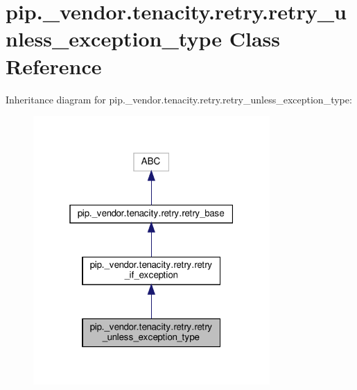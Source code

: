 \hypertarget{classpip_1_1__vendor_1_1tenacity_1_1retry_1_1retry__unless__exception__type}{}\section{pip.\+\_\+vendor.\+tenacity.\+retry.\+retry\+\_\+unless\+\_\+exception\+\_\+type Class Reference}
\label{classpip_1_1__vendor_1_1tenacity_1_1retry_1_1retry__unless__exception__type}


Inheritance diagram for pip.\+\_\+vendor.\+tenacity.\+retry.\+retry\+\_\+unless\+\_\+exception\+\_\+type\+:
\nopagebreak
\begin{figure}[H]
\begin{center}
\leavevmode
\includegraphics[width=256pt]{classpip_1_1__vendor_1_1tenacity_1_1retry_1_1retry__unless__exception__type__inherit__graph}
\end{center}
\end{figure}


